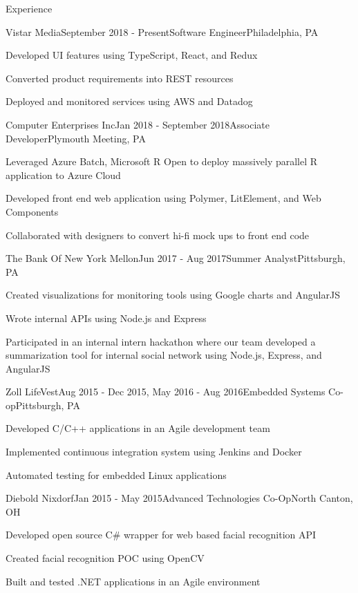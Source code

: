 \documentclass{resume} %
\begin{document}
\begin{rSection}{Experience}

\begin{rSubsection}{Vistar Media}{September 2018 - Present}{Software Engineer}{Philadelphia, PA}
\item Developed UI features using TypeScript, React, and Redux
\item Converted product requirements into REST resources
\item Deployed and monitored services using AWS and Datadog
\end{rSubsection}

\begin{rSubsection}{Computer Enterprises Inc}{Jan 2018 - September 2018}{Associate Developer}{Plymouth Meeting, PA}
\item Leveraged Azure Batch, Microsoft R Open to deploy massively parallel R application to Azure Cloud
\item Developed front end web application using Polymer, LitElement, and Web Components
\item Collaborated with designers to convert hi-fi mock ups to front end code
\end{rSubsection}

\begin{rSubsection}{The Bank Of New York Mellon}{Jun 2017 - Aug 2017}{Summer Analyst}{Pittsburgh, PA}
\item Created visualizations for monitoring tools using Google charts and AngularJS
\item Wrote internal APIs using Node.js and Express 
\item Participated in an internal intern hackathon where our team developed a summarization tool for internal social network using Node.js, Express, and AngularJS
\end{rSubsection}


\begin{rSubsection}{Zoll LifeVest}{Aug 2015 - Dec 2015, May 2016 - Aug 2016}{Embedded Systems Co-op}{Pittsburgh, PA}
\item Developed C/C++ applications in an Agile development team
\item Implemented continuous integration system using Jenkins and Docker
\item Automated testing for embedded Linux applications
\end{rSubsection}


\begin{rSubsection}{Diebold Nixdorf}{Jan 2015 - May 2015}{Advanced Technologies Co-Op}{North Canton, OH}
\item Developed open source C\# wrapper for web based facial recognition API
\item Created facial recognition POC using OpenCV
\item Built and tested .NET applications in an Agile environment
\end{rSubsection}

\end{rSection}
\end{document}
